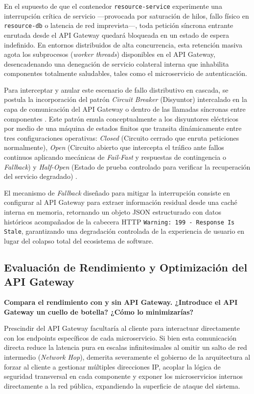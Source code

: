 \documentclass[12pt,journal,onecolumn]{IEEEtran}
\begin{document}
En el supuesto de que el contenedor \texttt{resource-service} experimente una interrupción crítica de servicio —provocada por saturación de hilos, fallo físico en \texttt{resource-db} o latencia de red imprevista—, toda petición síncrona entrante enrutada desde el API Gateway quedará bloqueada en un estado de espera indefinido. En entornos distribuidos de alta concurrencia, esta retención masiva agota los subprocesos (\textit{worker threads}) disponibles en el API Gateway, desencadenando una denegación de servicio colateral interna que inhabilita componentes totalmente saludables, tales como el microservicio de autenticación.

Para interceptar y anular este escenario de fallo distributivo en cascada, se postula la incorporación del patrón \textit{Circuit Breaker} (Disyuntor) intercalado en la capa de comunicación del API Gateway o dentro de las llamadas síncronas entre componentes \cite{richardson2018, burns2025}. Este patrón emula conceptualmente a los disyuntores eléctricos por medio de una máquina de estados finitos que transita dinámicamente entre tres configuraciones operativas: \textit{Closed} (Circuito cerrado que enruta peticiones normalmente), \textit{Open} (Circuito abierto que intercepta el tráfico ante fallos continuos aplicando mecánicas de \textit{Fail-Fast} y respuestas de contingencia o \textit{Fallback}) y \textit{Half-Open} (Estado de prueba controlado para verificar la recuperación del servicio degradado) \cite{burns2025}.

El mecanismo de \textit{Fallback} diseñado para mitigar la interrupción consiste en configurar al API Gateway para extraer información residual desde una caché interna en memoria, retornando un objeto JSON estructurado con datos históricos acompañados de la cabecera HTTP \texttt{Warning: 199 - Response Is Stale}, garantizando una degradación controlada de la experiencia de usuario en lugar del colapso total del ecosistema de software.

\subsection{\textbf{Evaluación de Rendimiento y Optimización del API Gateway}}
\textbf{Compara el rendimiento con y sin API Gateway. ¿Introduce el API Gateway un cuello de botella? ¿Cómo lo minimizarías?}

Prescindir del API Gateway facultaría al cliente para interactuar directamente con los endpoints específicos de cada microservicio. Si bien esta comunicación directa reduce la latencia pura en escalas infinitesimales al omitir un salto de red intermedio (\textit{Network Hop}), demerita severamente el gobierno de la arquitectura al forzar al cliente a gestionar múltiples direcciones IP, acoplar la lógica de seguridad transversal en cada componente y exponer los microservicios internos directamente a la red pública, expandiendo la superficie de ataque del sistema.
\end{document}

